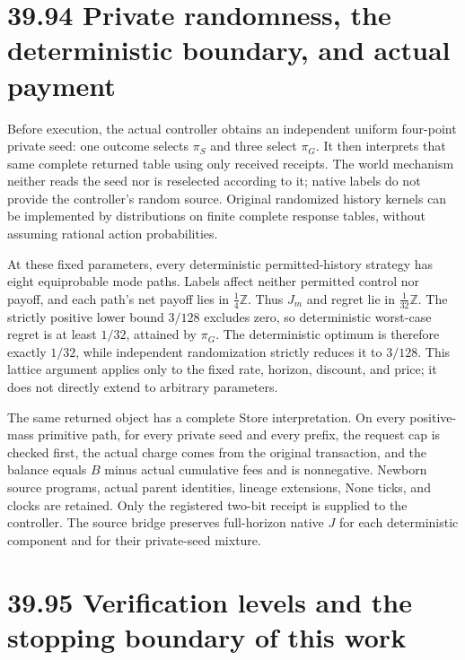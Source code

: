 \documentclass[
  english,
  11pt,
  oneside]{book}
\begin{document}
\section{39.94 Private randomness, the deterministic boundary, and actual payment}\label{private-randomness-the-deterministic-boundary-and-actual-payment}

Before execution, the actual controller obtains an independent uniform four-point private seed: one outcome selects \(\pi_S\) and three select \(\pi_G\). It then interprets that same complete returned table using only received receipts. The world mechanism neither reads the seed nor is reselected according to it; native labels do not provide the controller's random source. Original randomized history kernels can be implemented by distributions on finite complete response tables, without assuming rational action probabilities.

At these fixed parameters, every deterministic permitted-history strategy has eight equiprobable mode paths. Labels affect neither permitted control nor payoff, and each path's net payoff lies in \(\tfrac14\mathbb Z\). Thus \(J_m\) and regret lie in \(\tfrac1{32}\mathbb Z\). The strictly positive lower bound \(3/128\) excludes zero, so deterministic worst-case regret is at least \(1/32\), attained by \(\pi_G\). The deterministic optimum is therefore exactly \(1/32\), while independent randomization strictly reduces it to \(3/128\). This lattice argument applies only to the fixed rate, horizon, discount, and price; it does not directly extend to arbitrary parameters.

The same returned object has a complete Store interpretation. On every positive-mass primitive path, for every private seed and every prefix, the request cap is checked first, the actual charge comes from the original transaction, and the balance equals \(B\) minus actual cumulative fees and is nonnegative. Newborn source programs, actual parent identities, lineage extensions, None ticks, and clocks are retained. Only the registered two-bit receipt is supplied to the controller. The source bridge preserves full-horizon native \(J\) for each deterministic component and for their private-seed mixture.

\section{39.95 Verification levels and the stopping boundary of this work}\label{verification-levels-and-the-stopping-boundary-of-this-work}
\end{document}
